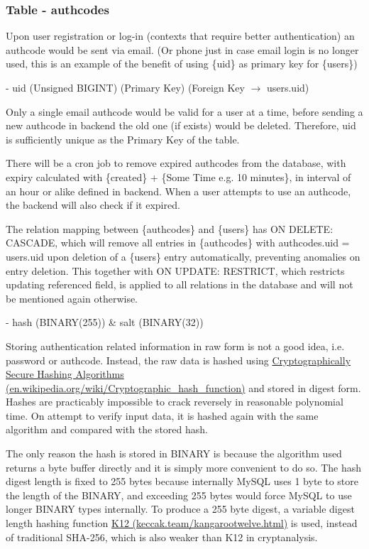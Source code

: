 \documentclass[12pt]{report}
\newcommand{\n}{\par}
\newcommand{\br}{\n\vspace{1 em}\n}
\begin{document}
\subsubsection{Table - authcodes} \label{data-layer.design.user-system.authcodes}
Upon user registration or log-in (contexts that require better authentication) an authcode would be sent via email.
(Or phone just in case email login is no longer used, this is an example of the benefit of using \{uid\} as primary key for \{users\})
\br
- uid (Unsigned BIGINT) (Primary Key) (Foreign Key $\rightarrow$ users.uid)\n
Only a single email authcode would be valid for a user at a time,
before sending a new authcode in backend the old one (if exists) would be deleted.
Therefore, uid is sufficiently unique as the Primary Key of the table.\n
There will be a cron job to remove expired authcodes from the database,
with expiry calculated with \{created\} + \{Some Time e.g. 10 minutes\},
in interval of an hour or alike defined in backend.
When a user attempts to use an authcode, the backend will also check if it expired.\n
The relation mapping between \{authcodes\} and \{users\} has ON DELETE: CASCADE,
which will remove all entries in \{authcodes\} with authcodes.uid = users.uid upon deletion of a \{users\} entry automatically,
preventing anomalies on entry deletion.
This together with ON UPDATE: RESTRICT, which restricts updating referenced field,
is applied to all relations in the database and will not be mentioned again otherwise.
\br
- hash (BINARY(255)) \& salt (BINARY(32))\n
Storing authentication related information in raw form is not a good idea, i.e. password or authcode.
Instead, the raw data is hashed using \href{https://en.wikipedia.org/wiki/Cryptographic_hash_function}{Cryptographically Secure Hashing Algorithms (en.wikipedia.org/wiki/Cryptographic\_hash\_function)} and stored in digest form.
Hashes are practicably impossible to crack reversely in reasonable polynomial time.
On attempt to verify input data, it is hashed again with the same algorithm and compared with the stored hash.\n
The only reason the hash is stored in BINARY is because the algorithm used returns a byte buffer directly and it is simply more convenient to do so.
The hash digest length is fixed to 255 bytes because internally MySQL uses 1 byte to store the length of the BINARY,
and exceeding 255 bytes would force MySQL to use longer BINARY types internally.
To produce a 255 byte digest, a variable digest length hashing function \href{https://keccak.team/kangarootwelve.html}{K12 (keccak.team/kangarootwelve.html)} is used,
instead of traditional SHA-256, which is also weaker than K12 in cryptanalysis.\n
\end{document}
